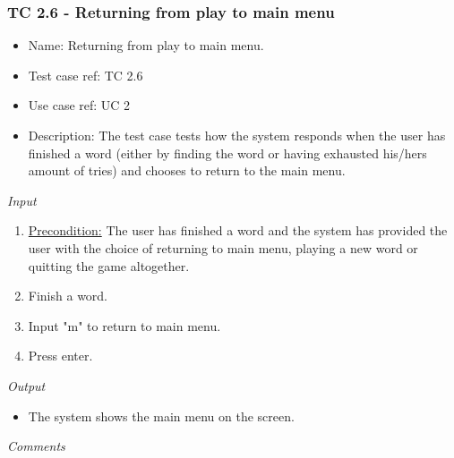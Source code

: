 \documentclass[12pt, letterpaper]{article}
\begin{document}
\subsubsection{TC 2.6 - Returning from play to main menu}
\begin{itemize}
	\item Name: Returning from play to main menu.
	\item Test case ref: TC 2.6
	\item Use case ref: UC 2
	\item Description: The test case tests how the system responds when the user has finished a word (either by finding the word or having exhausted his/hers amount of tries) and chooses to return to the main menu.
\end{itemize}
\emph{Input}
\begin{enumerate}
	\item \underline{Precondition:} The user has finished a word and the system has provided the user with the choice of returning to main menu, playing a new word or quitting the game altogether.
	\item Finish a word.
	\item Input "m" to return to main menu.
	\item Press enter.
\end{enumerate}
\emph{Output}
\begin{itemize}
	\item The system shows the main menu on the screen.
\end{itemize}
\begin{Form}
	\newline
	\newline
\end{Form}
\newline
\emph{Comments}
\newline
\newline
\newline
\newline
\newline
\newline
\newline
\end{document}
